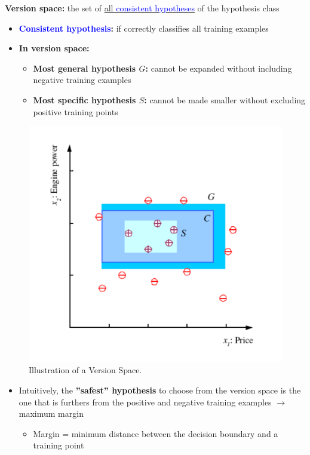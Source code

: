 \documentclass[12pt]{article}
\begin{document}
\textbf{Version space:} the set of \underline{all \textcolor{blue}{consistent hypotheses}} of the
hypothesis class

\begin{itemize}
  \item
    \textbf{\textcolor{blue}{Consistent hypothesis}:} if correctly classifies all training
    examples
  \item
    \textbf{In version space:}
  \begin{itemize}
    \item
      \textbf{Most general hypothesis $G$:} cannot be expanded without
      including negative training examples
    \item
      \textbf{Most specific hypothesis $S$:} cannot be made smaller
      without excluding positive training points
  \end{itemize}
\end{itemize}

\begin{figure}[H]
  \centering  %
    \includegraphics[width=0.5\columnwidth]{images/version-space.png}
    \caption{Illustration of a Version Space.}
    \label{fig:fig2}
\end{figure}

\begin{itemize}
\itemsep1pt\parskip0pt
\item
  Intuitively, the \textbf{''safest'' hypothesis} to choose from the
  version space is the one that is furthers from the positive and
  negative training examples $\rightarrow$ maximum margin

  \begin{itemize}
  \itemsep1pt\parskip0pt
  \item
    Margin = minimum distance between the decision boundary and a
    training point
  \end{itemize}
\end{itemize}
\end{document}
